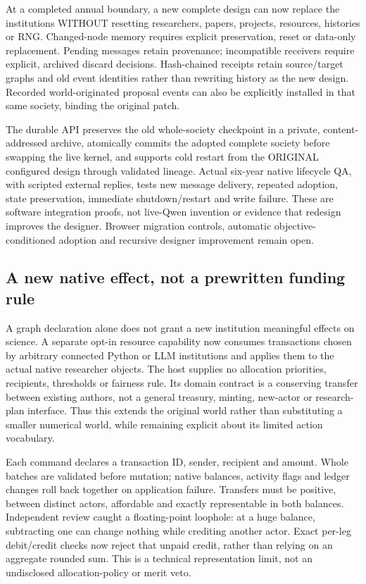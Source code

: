 At a completed annual boundary, a new complete design can now replace the
institutions WITHOUT resetting researchers, papers, projects, resources,
histories or RNG. Changed-node memory requires explicit preservation, reset
or data-only replacement. Pending messages retain provenance; incompatible
receivers require explicit, archived discard decisions. Hash-chained receipts
retain source/target graphs and old event identities rather than rewriting
history as the new design. Recorded world-originated proposal events can also
be explicitly installed in that same society, binding the original patch.

The durable API preserves the old whole-society checkpoint in a private,
content-addressed archive, atomically commits the adopted complete society
before swapping the live kernel, and supports cold restart from the ORIGINAL
configured design through validated lineage. Actual six-year native lifecycle
QA, with scripted external replies, tests new message delivery, repeated
adoption, state preservation, immediate shutdown/restart and write failure.
These are software integration proofs, not live-Qwen invention or evidence
that redesign improves the designer. Browser migration controls, automatic
objective-conditioned adoption and recursive designer improvement remain open.

\subsection{A new native effect, not a prewritten funding rule}

A graph declaration alone does not grant a new institution meaningful effects
on science. A separate opt-in resource capability now consumes transactions
chosen by arbitrary connected Python or LLM institutions and applies them to
the actual native researcher objects. The host supplies no allocation
priorities, recipients, thresholds or fairness rule. Its domain contract is a
conserving transfer between existing authors, not a general treasury, minting,
new-actor or research-plan interface. Thus this extends the original world
rather than substituting a smaller numerical world, while remaining explicit
about its limited action vocabulary.

Each command declares a transaction ID, sender, recipient and amount. Whole
batches are validated before mutation; native balances, activity flags and
ledger changes roll back together on application failure. Transfers must be
positive, between distinct actors, affordable and exactly representable in both
balances. Independent review caught a floating-point loophole: at a huge
balance, subtracting one can change nothing while crediting another actor.
Exact per-leg debit/credit checks now reject that unpaid credit, rather than
relying on an aggregate rounded sum. This is a technical representation limit,
not an undisclosed allocation-policy or merit veto.

